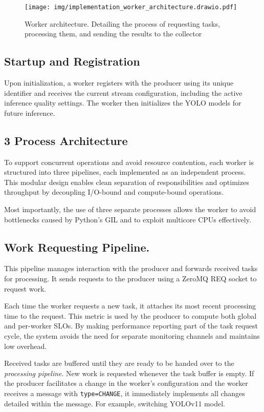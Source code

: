 \begin{figure}[htbp]
    \centering
    \texttt{[image: img/implementation\_worker\_architecture.drawio.pdf]}
    \caption{Worker architecture. Detailing the process of requesting tasks, processing them, and sending the results to the collector}
    \label{fig:implementation-worker-architecture}
\end{figure}

\subsection{Startup and Registration}
Upon initialization, a worker registers with the producer using its unique identifier and receives the current stream configuration, including the active inference quality settings. The worker then initializes the YOLO models for future inference.

\subsection{3 Process Architecture}
To support concurrent operations and avoid resource contention, each worker is structured into three pipelines, each implemented as an independent process. This modular design enables clean separation of responsibilities and optimizes throughput by decoupling I/O-bound and compute-bound operations.

Most importantly, the use of three separate processes allows the worker to avoid bottlenecks caused by Python’s GIL and to exploit multicore CPUs effectively.

\subsection{Work Requesting Pipeline.}
This pipeline manages interaction with the producer and forwards received tasks for processing. It sends requests to the producer using a ZeroMQ REQ socket to request work. 

Each time the worker requests a new task, it attaches its most recent processing time to the request. This metric is used by the producer to compute both global and per-worker SLOs. By making performance reporting part of the task request cycle, the system avoids the need for separate monitoring channels and maintains low overhead.

Received tasks are buffered until they are ready to be handed over to the \textit{processing pipeline}. New work is requested whenever the task buffer is empty. If the producer facilitates a change in the worker's configuration and the worker receives a message with \texttt{type=CHANGE}, it immediately implements all changes detailed within the message. For example, switching YOLOv11 model.

